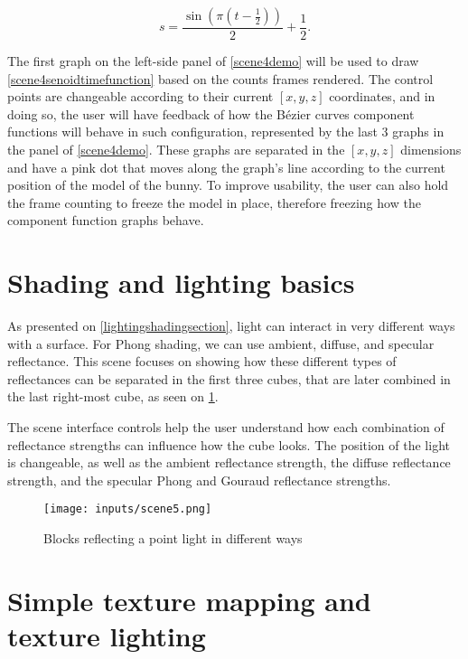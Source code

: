 \documentclass[cic,tc,english]{iiufrgs}
\begin{document}
\begin{equation}
    s =\frac{\sin(\pi (t - \frac{1}{2}))}{2}  + \frac{1}{2}.
    \label{scene4senoidtimefunction}
\end{equation}

The first graph on the left-side panel of \cref{scene4demo} will be used to draw \cref{scene4senoidtimefunction} based on the counts frames rendered. The control points are changeable according to their current $[x,y,z]$ coordinates, and in doing so, the user will have feedback of how the Bézier curves component functions will behave in such configuration, represented by the last 3 graphs in the panel of  \cref{scene4demo}. These graphs are separated in the $[x,y,z]$ dimensions and have a pink dot that moves along the graph's line according to the current position of the model of the bunny. To improve usability, the user can also hold the frame counting to freeze the model in place, therefore freezing how the component function graphs behave.


%
\section{Shading and lighting basics}
\label{shadinglightingscene}

As presented on \cref{lightingshadingsection}, light can interact in very different ways with a surface. For Phong shading, we can use ambient, diffuse, and specular reflectance. This scene focuses on showing how these different types of reflectances can be separated in the first three cubes, that are later combined in the last right-most cube, as seen on \cref{scene5demo}.

The scene interface controls help the user understand how each combination of reflectance strengths can influence how the cube looks. The position of the light is changeable, as well as the ambient reflectance strength, the diffuse reflectance strength, and the specular Phong and Gouraud reflectance strengths.
\begin{figure}[hbt!]
    \caption{Blocks reflecting a point light in different ways}
    \begin{center}
        \texttt{[image: inputs/scene5.png]}
    \end{center}
    \label{scene5demo}
\end{figure}

%
\section{Simple texture mapping and texture lighting}
\end{document}
